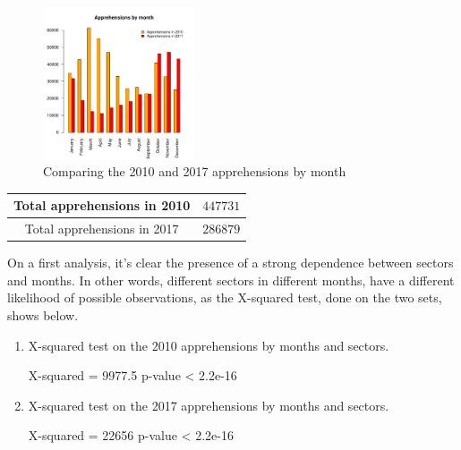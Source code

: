 \documentclass[journal, a4paper]{IEEEtran}
\begin{document}
\begin{figure}[!hbt]
\begin{center}

{

\includegraphics[width=0.4\textwidth]{pdf_template3-fig1}
\caption{Comparing the 2010 and 2017 apprehensions by month}
}

\end{center}
\end{figure} 


	\begin{table}[!hbt]
		\begin{center}
			\label{tab:simParameters}

			
			
			\begin{tabular}{|c|c|}
				\hline
			Total apprehensions in 2010 & $447731$ \\
				\hline
			 Total apprehensions in 2017 & $286879$ \\
				\hline
			\end{tabular}
		\end{center}
	\end{table}
	
On a first analysis, it's clear the presence of a strong dependence between sectors and months. In other words, different sectors in different months, have a different likelihood of possible observations, as the X-squared test, done on the two sets, shows below.


\begin{enumerate}

\item X-squared test on the 2010 apprehensions by months and sectors.

\subitem X-squared = 9977.5      p-value < 2.2e-16


\item X-squared test on the 2017 apprehensions by months and sectors.

\subitem X-squared = 22656       p-value < 2.2e-16



\end{enumerate}
\end{document}
